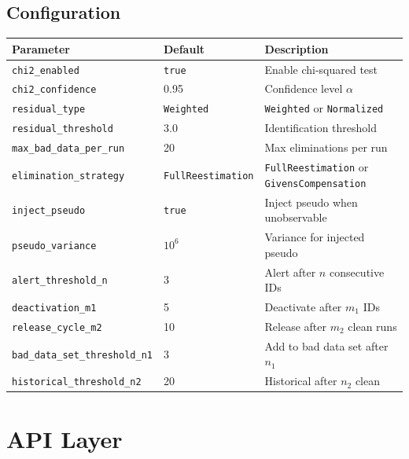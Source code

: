 \documentclass[11pt,a4paper]{article}
\begin{document}
\subsection{Configuration}

\begin{center}
\small
\begin{tabular}{llp{48mm}}
  \toprule
  \textbf{Parameter} & \textbf{Default} & \textbf{Description} \\
  \midrule
  \texttt{chi2\_enabled}       & \texttt{true}   & Enable chi-squared test \\
  \texttt{chi2\_confidence}    & 0.95            & Confidence level $\alpha$ \\
  \texttt{residual\_type}      & \texttt{Weighted} & \texttt{Weighted} or
    \texttt{Normalized} \\
  \texttt{residual\_threshold} & 3.0             & Identification threshold \\
  \texttt{max\_bad\_data\_per\_run} & 20          & Max eliminations per run \\
  \texttt{elimination\_strategy} & \texttt{FullReestimation}
    & \texttt{FullReestimation} or \texttt{GivensCompensation} \\
  \texttt{inject\_pseudo}      & \texttt{true}   & Inject pseudo when unobservable \\
  \texttt{pseudo\_variance}    & $10^6$          & Variance for injected pseudo \\
  \texttt{alert\_threshold\_n}  & 3              & Alert after $n$ consecutive IDs \\
  \texttt{deactivation\_m1}     & 5              & Deactivate after $m_1$ IDs \\
  \texttt{release\_cycle\_m2}   & 10             & Release after $m_2$ clean runs \\
  \texttt{bad\_data\_set\_threshold\_n1} & 3     & Add to bad data set after $n_1$ \\
  \texttt{historical\_threshold\_n2}     & 20    & Historical after $n_2$ clean \\
  \bottomrule
\end{tabular}
\end{center}



\section{API Layer}\label{sec:api}
\end{document}
